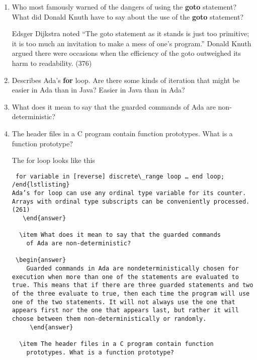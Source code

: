 \begin{enumerate}
  \item Who most famously warned of the dangers of using the
    \textbf{goto} statement? What did Donald Knuth have to
    say about the use of the \textbf{goto} statement?

 \begin{answer}
    Edsger Dijkstra noted “The goto statement as it stands is just too primitive; it is too much an invitation to make a mess of one’s program.” Donald Knuth argued there were occasions when the efficiency of the goto outweighed its harm to readability. (376)
     \end{answer}

  \item Describes Ada's \textbf{for} loop. Are there some
    kinds of iteration that might be easier in Ada than
    in Java? Easier in Java than in Ada?

  \item What does it mean to say that the guarded commands
    of Ada are non-deterministic?

  \item The header files in a C program contain function
    prototypes. What is a function prototype?

 \begin{answer}
    The for loop looks like this
\begin{lstlisting} for variable in [reverse] discrete\_range loop … end loop; /end{lstlisting}
Ada’s for loop can use any ordinal type variable for its counter. Arrays with ordinal type subscripts can be conveniently processed. (261)
   \end{answer}
   
  \item What does it mean to say that the guarded commands
    of Ada are non-deterministic?

 \begin{answer}
    Guarded commands in Ada are nondeterministically chosen for execution when more than one of the statements are evaluated to true. This means that if there are three guarded statements and two of the three evaluate to true, then each time the program will use one of the two statements. It will not always use the one that appears first nor the one that appears last, but rather it will choose between them non-deterministically or randomly.
     \end{answer}

  \item The header files in a C program contain function
    prototypes. What is a function prototype?


\end{lstlisting}
\end{answer}
\end{enumerate}
